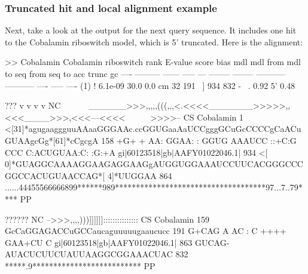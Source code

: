 \subsubsection{Truncated hit and local alignment example}
Next, take a look at the  output for the next query
sequence. It includes one hit to the Cobalamin riboswitch model, which
is 5' truncated. Here is the alignment:

\begin{sreoutput}
>> Cobalamin  Cobalamin riboswitch
 rank     E-value  score  bias mdl mdl from   mdl to       seq from      seq to       acc trunc   gc
 ----   --------- ------ ----- --- -------- --------    ----------- -----------      ---- ----- ----
  (1) !   6.1e-09   30.0   0.0  cm       32      191 ~]         934         832 - ~. 0.92    5' 0.48

                                                 ???              v           v      v    v                          NC
                                     ~~~~~~______>>>,,,,,(((,,,<.<<<<_______>>>>>,,<<<____>>>,<<<---<<<<~~~~~~>>>>-- CS
                       Cobalamin   1 <[31]*agugaaggguuAAaaGGGAAc.ccGGUGaaAaUCCgggGCuGcCCCCgCaACuGUAAgcGg*[61]*cCgcgA 158
                                             +G+     + AA: GGAA: : GGUG AAAUCC ::+C:G CCC  C:ACUGUAA:C:        :G:+A
  gi|60123518|gb|AAFY01022046.1| 934 <[ 0]*GUAGGCAAAAGGAAGAGGAAGgAUGGUGGAAAUCCUUCACGGGCCCGGCCACUGUAACCAG*[ 4]*UUGGAA 864
                                     ......44455566666899******989************************************97...7..79**** PP

                                                 ??????                NC
                                     -->>>,,,,)))]]]]]]::::::::::::::: CS
                       Cobalamin 159 GcCaGGAGACCuGCCaucaguuuuugaaucucc 191
                                     G+CAG A AC :  C   ++++   GAA+CU C
  gi|60123518|gb|AAFY01022046.1| 863 GUCAG-AUACUCUUCUAUUAAGGCGGAAACUAC 832
                                     *****.9************************** PP
\end{sreoutput}

